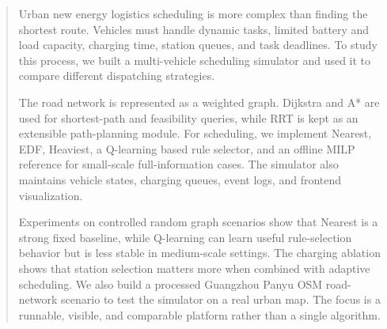 \begin{abstract}
Urban new energy logistics scheduling is more complex than finding the shortest route. Vehicles must handle dynamic tasks, limited battery and load capacity, charging time, station queues, and task deadlines. To study this process, we built a multi-vehicle scheduling simulator and used it to compare different dispatching strategies.

The road network is represented as a weighted graph. Dijkstra and A* are used for shortest-path and feasibility queries, while RRT is kept as an extensible path-planning module. For scheduling, we implement Nearest, EDF, Heaviest, a Q-learning based rule selector, and an offline MILP reference for small-scale full-information cases. The simulator also maintains vehicle states, charging queues, event logs, and frontend visualization.

Experiments on controlled random graph scenarios show that Nearest is a strong fixed baseline, while Q-learning can learn useful rule-selection behavior but is less stable in medium-scale settings. The charging ablation shows that station selection matters more when combined with adaptive scheduling. We also build a processed Guangzhou Panyu OSM road-network scenario to test the simulator on a real urban map. The focus is a runnable, visible, and comparable platform rather than a single algorithm.
\end{abstract}
